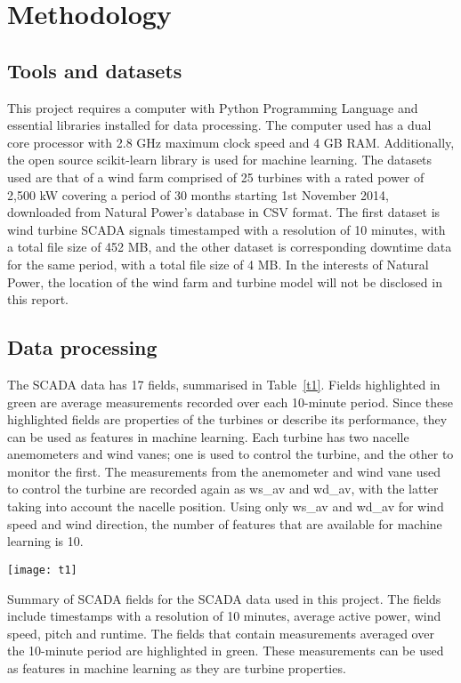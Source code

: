 
\chapter{Methodology}\label{c2}

\section{Tools and datasets}

This project requires a computer with Python Programming Language \cite{Welco} and essential libraries installed for data processing. The computer used has a dual core processor with 2.8 GHz maximum clock speed and 4 GB RAM. Additionally, the open source scikit-learn library \cite{Pedre11} is used for machine learning. The datasets used are that of a wind farm comprised of 25 turbines with a rated power of 2,500 kW covering a period of 30 months starting 1st November 2014, downloaded from Natural Power's database in CSV format. The first dataset is wind turbine SCADA signals timestamped with a resolution of 10 minutes, with a total file size of 452 MB, and the other dataset is corresponding downtime data for the same period, with a total file size of 4 MB. In the interests of Natural Power, the location of the wind farm and turbine model will not be disclosed in this report.

\section{Data processing}

The SCADA data has 17 fields, summarised in Table~\ref{t1}. Fields highlighted in green are average measurements recorded over each 10-minute period. Since these highlighted fields are properties of the turbines or describe its performance, they can be used as features in machine learning. Each turbine has two nacelle anemometers and wind vanes; one is used to control the turbine, and the other to monitor the first. The measurements from the anemometer and wind vane used to control the turbine are recorded again as ws\_av and wd\_av, with the latter taking into account the nacelle position. Using only ws\_av and wd\_av for wind speed and wind direction, the number of features that are available for machine learning is 10.

\begin{table}
    \centering
    \texttt{[image: t1]}
    \caption{\label{t1}Summary of SCADA fields for the SCADA data used in this project. The fields include timestamps with a resolution of 10 minutes, average active power, wind speed, pitch and runtime. The fields that contain measurements averaged over the 10-minute period are highlighted in green. These measurements can be used as features in machine learning as they are turbine properties.}
\end{table}


